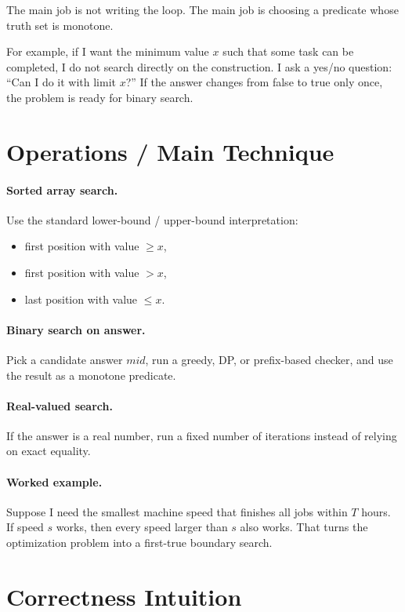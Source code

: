 The main job is not writing the loop. The main job is choosing a predicate whose truth set is monotone.

For example, if I want the minimum value \(x\) such that some task can be completed, I do not search directly on the
construction. I ask a yes/no question: ``Can I do it with limit \(x\)?'' If the answer changes from false to true only
once, the problem is ready for binary search.

\section*{Operations / Main Technique}

\paragraph{Sorted array search.}
Use the standard lower-bound / upper-bound interpretation:
\begin{itemize}
  \item first position with value \(\ge x\),
  \item first position with value \(> x\),
  \item last position with value \(\le x\).
\end{itemize}

\paragraph{Binary search on answer.}
Pick a candidate answer \(mid\), run a greedy, DP, or prefix-based checker, and use the result as a monotone
predicate.

\paragraph{Real-valued search.}
If the answer is a real number, run a fixed number of iterations instead of relying on exact equality.

\paragraph{Worked example.}
Suppose I need the smallest machine speed that finishes all jobs within \(T\) hours. If speed \(s\) works, then every
speed larger than \(s\) also works. That turns the optimization problem into a first-true boundary search.

\section*{Correctness Intuition}

